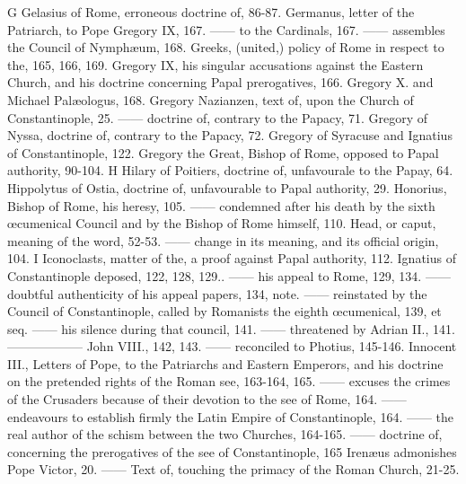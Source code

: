 G Gelasius of Rome, erroneous doctrine of, 86-87. Germanus, letter of the Patriarch, to Pope Gregory IX, 167. —— to the Cardinals, 167. —— assembles the Council of Nymphæum, 168. Greeks, (united,) policy of Rome in respect to the, 165, 166, 169. Gregory IX, his singular accusations against the Eastern Church, and his doctrine concerning Papal prerogatives, 166. Gregory X. and Michael Palæologus, 168. Gregory Nazianzen, text of, upon the Church of Constantinople, 25. —— doctrine of, contrary to the Papacy, 71. Gregory of Nyssa, doctrine of, contrary to the Papacy, 72. Gregory of Syracuse and Ignatius of Constantinople, 122. Gregory the Great, Bishop of Rome, opposed to Papal authority, 90-104. H Hilary of Poitiers, doctrine of, unfavourale to the Papay, 64. Hippolytus of Ostia, doctrine of, unfavourable to Papal authority, 29. Honorius, Bishop of Rome, his heresy, 105. —— condemned after his death by the sixth œcumenical Council and by the Bishop of Rome himself, 110. Head, or caput, meaning of the word, 52-53. —— change in its meaning, and its official origin, 104. I Iconoclasts, matter of the, a proof against Papal authority, 112. Ignatius of Constantinople deposed, 122, 128, 129.. —— his appeal to Rome, 129, 134. —— doubtful authenticity of his appeal papers, 134, note. —— reinstated by the Council of Constantinople, called by Romanists the eighth œcumenical, 139, et seq. —— his silence during that council, 141. —— threatened by Adrian II., 141. —————— John VIII., 142, 143. —— reconciled to Photius, 145-146. Innocent III., Letters of Pope, to the Patriarchs and Eastern Emperors, and his doctrine on the pretended rights of the Roman see, 163-164, 165. —— excuses the crimes of the Crusaders because of their devotion to the see of Rome, 164. —— endeavours to establish firmly the Latin Empire of Constantinople, 164. —— the real author of the schism between the two Churches, 164-165. —— doctrine of, concerning the prerogatives of the see of Constantinople, 165 Irenæus admonishes Pope Victor, 20. —— Text of, touching the primacy of the Roman Church, 21-25.

